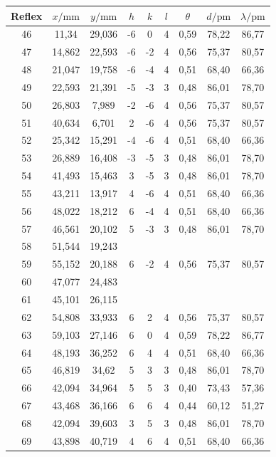 \begin{table}\ContinuedFloat
\centering
\begin{tabular}{ccccccccc}
\toprule
Reflex & $x/\si{\milli\meter}$ & $y/\si{\milli\meter}$ & $h$ & $k$ & $l$ & $\theta$ & $d/\si{\pico\meter}$ & $\lambda/\si{\pico\meter}$\\
\midrule
46 & 11,34 & 29,036 & -6 & 0 & 4 & 0,59 & 78,22 & 86,77\\
47 & 14,862 & 22,593 & -6 & -2 & 4 & 0,56 & 75,37 & 80,57\\
48 & 21,047 & 19,758 & -6 & -4 & 4 & 0,51 & 68,40 & 66,36\\
49 & 22,593 & 21,391 & -5 & -3 & 3 & 0,48 & 86,01 & 78,70\\
50 & 26,803 & 7,989 & -2 & -6 & 4 & 0,56 & 75,37 & 80,57\\
51 & 40,634 & 6,701 & 2 & -6 & 4 & 0,56 & 75,37 & 80,57\\
52 & 25,342 & 15,291 & -4 & -6 & 4 & 0,51 & 68,40 & 66,36\\
53 & 26,889 & 16,408 & -3 & -5 & 3 & 0,48 & 86,01 & 78,70\\
54 & 41,493 & 15,463 & 3 & -5 & 3 & 0,48 & 86,01 & 78,70\\
55 & 43,211 & 13,917 & 4 & -6 & 4 & 0,51 & 68,40 & 66,36\\
56 & 48,022 & 18,212 & 6 & -4 & 4 & 0,51 & 68,40 & 66,36\\
57 & 46,561 & 20,102 & 5 & -3 & 3 & 0,48 & 86,01 & 78,70\\
58 & 51,544 & 19,243 &  &  &  &  &  & \\
59 & 55,152 & 20,188 & 6 & -2 & 4 & 0,56 & 75,37 & 80,57\\
60 & 47,077 & 24,483 &  &  &  &  &  & \\
61 & 45,101 & 26,115 &  &  &  &  &  & \\
62 & 54,808 & 33,933 & 6 & 2 & 4 & 0,56 & 75,37 & 80,57\\
63 & 59,103 & 27,146 & 6 & 0 & 4 & 0,59 & 78,22 & 86,77\\
64 & 48,193 & 36,252 & 6 & 4 & 4 & 0,51 & 68,40 & 66,36\\
65 & 46,819 & 34,62 & 5 & 3 & 3 & 0,48 & 86,01 & 78,70\\
66 & 42,094 & 34,964 & 5 & 5 & 3 & 0,40 & 73,43 & 57,36\\
67 & 43,468 & 36,166 & 6 & 6 & 4 & 0,44 & 60,12 & 51,27\\
68 & 42,094 & 39,603 & 3 & 5 & 3 & 0,48 & 86,01 & 78,70\\
69 & 43,898 & 40,719 & 4 & 6 & 4 & 0,51 & 68,40 & 66,36\\

\end{tabular}
\end{table}
